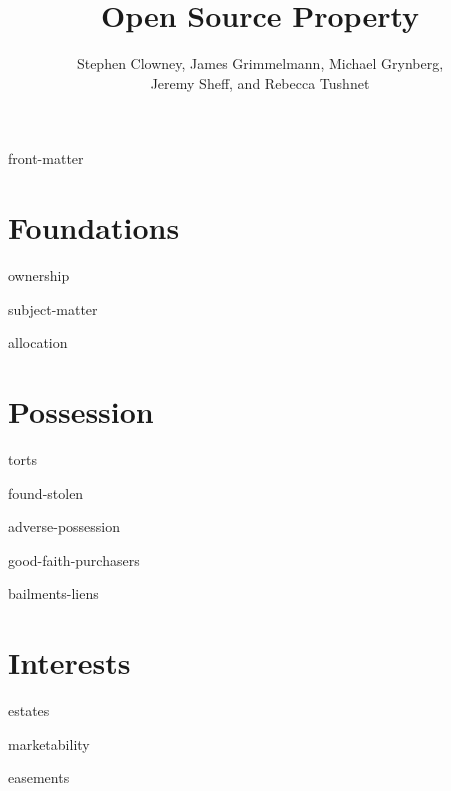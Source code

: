 \documentclass[12pt]{book}
\title{Open Source Property}
\author{Stephen Clowney, James Grimmelmann, Michael Grynberg,\\
Jeremy Sheff, and Rebecca Tushnet}
\begin{document}
%
%
\sloppy
\frenchspacing
\raggedbottom
{}

%
%

\frontmatter

\maketitle

\tableofcontents

\module front-matter



%
%

\mainmatter


%
%

\part{Foundations}

\module ownership

\module subject-matter

\module allocation



\part{Possession}

\module torts

\module found-stolen

\module adverse-possession

\module good-faith-purchasers

\module bailments-liens


\part{Interests}

\module estates

\module marketability

\module easements
\end{document}
